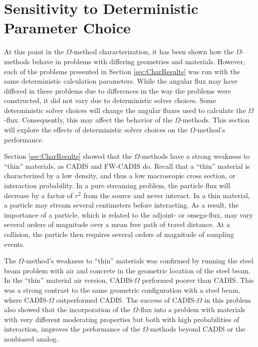 \section{Sensitivity to Deterministic Parameter Choice}
\label{sec:AngleResults}

At this point in the $\Omega$-method characterization,
it has been shown how the $\Omega$-methods
behave in problems with differing geometries and materials.
However, each of the problems presented in Section \ref{sec:CharResults}
was run with the same deterministic calculation
parameters. While the angular flux may have differed in these problems due to
differences in the way the problems were constructed, it did not
vary due to deterministic
solver choices. Some deterministic solver choices will change the angular
fluxes used to calculate the $\Omega$-flux. Consequently, this may affect the
behavior of the $\Omega$-methods. This section will
explore the effects of deterministic solver
choices on the $\Omega$-method's performance.

Section \ref{sec:CharResults} showed that the $\Omega$-methods have a strong
weakness to ``thin'' materials, as CADIS and FW-CADIS do. Recall that a
``thin'' material is characterized by a low density, and thus a low macroscopic
cross section, or interaction
probability. In a pure streaming problem, the particle flux will decrease by a
factor of $r^2$ from the source and never interact.
In a thin material, a particle may stream
several centimeters before interacting. As a result, the
importance of a particle, which is related to the adjoint- or omega-flux,
may vary several orders of magnitude over a mean free
path of travel distance. At a collision, the particle then requires
several orders of
magnitude of sampling events.

The $\Omega$-method's weakness to ``thin'' materials was confirmed by
running the steel beam problem with air and concrete in the geometric location
of the steel beam. In
the ``thin'' material air version, CADIS-$\Omega$ performed poorer than CADIS.
This was a strong contrast to the same geometric configuration with a steel
beam, where CADIS-$\Omega$ outperformed CADIS.
The success of CADIS-$\Omega$ in this problem also showed that
the incorporation of the $\Omega$-flux into a problem with materials with
very different moderating properties but both with high probabilities of
interaction, improves the performance of the $\Omega$-methods beyond CADIS or
the nonbiased analog.

